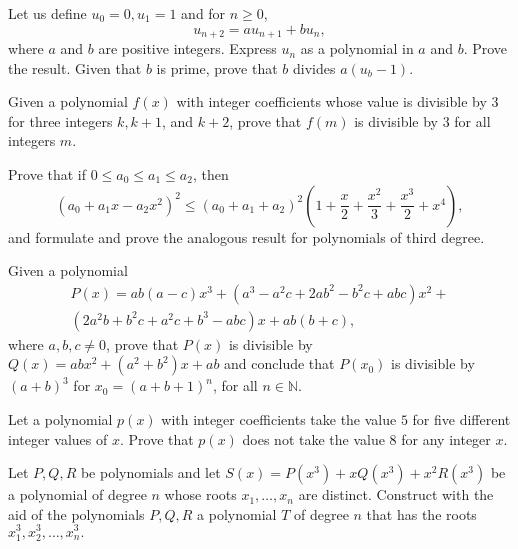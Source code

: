 \begin{question}[name={1969 IMO Longlist}]
    Let us define $u_0 = 0, u_1 = 1$ and for $n \geq 0$, \[u_{n+2} = au_{n+1} +bu_n ,\] where $a$ and $b$ are positive integers. Express $u_n$ as a polynomial in $a$ and $b$. Prove the result. Given that $b$ is prime, prove that $b$ divides $a(u_b -1)$.
\end{question}





\begin{question}[name={1969 IMO Longlist}]
    Given a polynomial $f(x)$ with integer coefficients whose value is divisible by $3$ for three integers $k, k +1$, and $k +2$, prove that $f(m)$ is divisible by $3$ for all integers $m$.
\end{question}





\begin{question}[name={1969 IMO Longlist}]
    Prove that if $0\leq a_0 \leq a_1 \leq a_2$, then 
    \[(a_0+a_1x-a_2x^2)^2 \leq (a_0+a_1+a_2)^2 \left(1+\frac{x}{2}+\frac{x^2}{3}+\frac{x^3}{2}+x^4\right),\]
    and formulate and prove the analogous result for polynomials of third degree.
\end{question}


\begin{question}[name={1970 IMO Longlist}]
    Given a polynomial
    \begin{multline*}
        P(x) = ab(a-c)x^3 +(a^3-a^2c+2ab^2-b^2c+abc)x^2 +\\
        (2a^2b+b^2c+a^2c+b^3-abc)x+ab(b+c),
    \end{multline*}
    where $a,b, c \neq  0$, prove that $P(x)$ is divisible by $Q(x) = abx^2 +(a^2 +b^2)x+ab$ and conclude that $P(x_0)$ is divisible by $(a+b)^3$ for $x_0 = (a+b+1)^n$, for all $n \in\mathbb N$.
\end{question}


\begin{question}[name={1970 IMO Longlist}]
    Let a polynomial $p(x)$ with integer coefficients take the value $5$ for five different integer values of $x$. Prove that $p(x)$ does not take the value $8$ for any integer $x$.
\end{question}

\begin{question}[name={1970 IMO Shortlist}]
    Let $P,Q,R$ be polynomials and let $S(x) = P(x^3) + xQ(x^3) + x^2R(x^3)$ be a polynomial of degree $n$ whose roots $x_1,\dots, x_n$ are distinct. Construct with the aid of the polynomials $P,Q,R$ a polynomial $T$ of degree $n$ that has the roots $x_1^3 , x_2^3 , \dots, x_n^3.$
\end{question}

